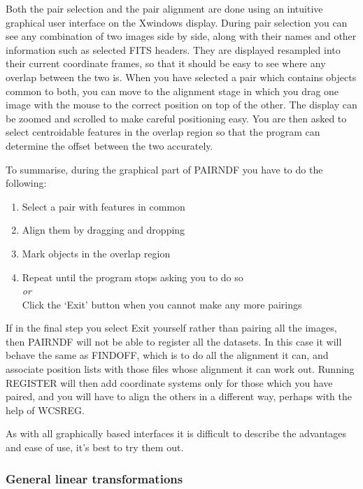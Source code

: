 \documentclass[twoside,11pt]{article}
\newcommand{\htmlref}[2]{#1}
\newcommand{\xlabel}[1]{}
\renewcommand{\_}{\texttt{\symbol{95}}}
\newcommand{\routine}[1]{{\sc #1}}
\newcommand{\xroutine}[1]{\htmlref{{\sc #1}}{#1}}
\begin{document}
Both the pair selection and the pair alignment are done using an
intuitive graphical user interface on the Xwindows display.
During pair selection you can see any combination of
two images side by side, along with their names and other information
such as selected FITS headers.  They are displayed resampled into
their current coordinate frames, so that it should be easy to see
where any overlap between the two is.  When you have selected a pair
which contains objects common to both, you can move to 
the alignment stage
in which you drag one image with the mouse to the correct position 
on top of the other.  
The display can be zoomed and scrolled to make careful positioning easy.
You are then asked to select centroidable features in the 
overlap region so that the program
can determine the offset between the two accurately.

To summarise, during the graphical part of \routine{PAIRNDF} 
you have to do the following:
\begin{enumerate}
\item Select a pair with features in common
\item Align them by dragging and dropping
\item Mark objects in the overlap region
\item Repeat until the program stops asking you to do so \\
      {\em or\/}\\
      Click the `Exit' button when you cannot make any more pairings
\end{enumerate}
If in the final step you select Exit yourself rather than pairing all
the images, then \routine{PAIRNDF} will not be able to register
all the datasets.  In this case it will behave the same as 
\xroutine{FINDOFF}, which is to do all the alignment it can,
and associate position lists with those files whose alignment it
can work out.
Running \routine{REGISTER} will then add coordinate systems only
for those which you have paired, and you will have to align the
others in a different way, perhaps with the help of \xroutine{WCSREG}.

As with all graphically based interfaces it is difficult to 
describe the advantages and ease of use, it's best to try them out.


\subsubsection{\xlabel{usinglineartransforms}General linear transformations
               \label{usinglineartransforms}}
\end{document}
